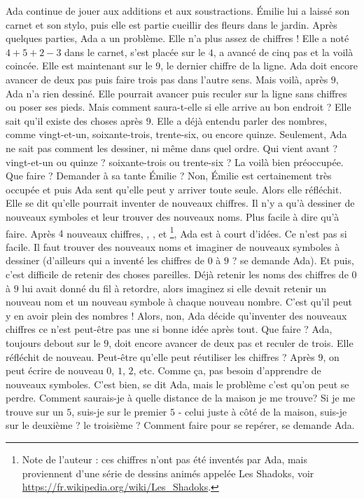 Ada continue de jouer aux additions et aux soustractions. 
Émilie lui a laissé son carnet et son stylo, puis elle est partie cueillir des fleurs dans le jardin. 
Après quelques parties, Ada a un problème. 
Elle n’a plus assez de chiffres ! 
Elle a noté $4 + 5 + 2 - 3$ dans le carnet, s’est placée sur le $4$, a avancé de cinq pas et la voilà coincée. 
Elle est maintenant sur le $9$, le dernier chiffre de la ligne. 
Ada doit encore avancer de deux pas puis faire trois pas dans l’autre sens.
Mais voilà, après $9$, Ada n’a rien dessiné.
Elle pourrait avancer puis reculer sur la ligne sans chiffres ou poser ses pieds. Mais comment saura-t-elle si elle arrive au bon endroit ? 
Elle sait qu’il existe des choses après $9$. 
Elle a déjà entendu parler des nombres, comme vingt-et-un, soixante-trois, trente-six, ou encore quinze. 
Seulement, Ada ne sait pas comment les dessiner, ni même dans quel ordre.
Qui vient avant ? vingt-et-un ou quinze ? soixante-trois ou trente-six ?
La voilà bien préoccupée. Que faire ? Demander à sa tante Émilie ? Non, Émilie est certainement très occupée et puis Ada sent qu’elle peut y arriver toute seule. Alors elle réfléchit. Elle se dit qu’elle pourrait inventer de nouveaux chiffres. 
Il n’y a qu'à dessiner de nouveaux symboles et leur trouver des nouveaux noms. Plus facile à dire qu'à faire. Après $4$ nouveaux chiffres, , ,  et \footnote{Note de l'auteur : ces chiffres n'ont pas été inventés par Ada, mais proviennent d'une série de dessins animés appelée Les Shadoks, voir \url{https://fr.wikipedia.org/wiki/Les_Shadoks}.}, Ada est à court d'idées. 
Ce n’est pas si facile. Il faut trouver des nouveaux noms et imaginer de nouveaux symboles à dessiner (d’ailleurs qui a inventé les chiffres de $0$ à $9$ ? se demande Ada). Et puis, c’est difficile de retenir des choses pareilles. Déjà retenir les noms des chiffres de $0$ à $9$ lui avait donné du fil à retordre, alors imaginez si elle devait retenir un nouveau nom et un nouveau symbole à chaque nouveau nombre.
C’est qu’il peut y en avoir plein des nombres ! 
Alors, non, Ada décide qu’inventer des nouveaux chiffres ce n’est peut-être pas une si bonne idée après tout. 
Que faire ? Ada, toujours debout sur le $9$, doit encore avancer de deux pas et reculer de trois. Elle réfléchit de nouveau. Peut-être qu’elle peut réutiliser les chiffres ? 
Après $9$, on peut écrire de nouveau $0$, $1$, $2$, etc. Comme ça, pas besoin d’apprendre de nouveaux symboles. C’est bien, se dit Ada, mais le problème c’est qu’on peut se perdre. 
Comment saurais-je à quelle distance de la maison je me trouve? Si je me trouve sur un $5$, suis-je sur le premier $5$ - celui juste à côté de la maison, suis-je sur le deuxième ? le troisième ? Comment faire pour se repérer, se demande Ada.
